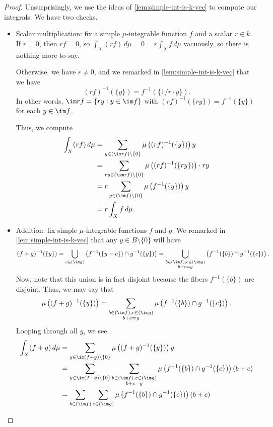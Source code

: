 \documentclass[../notes.tex]{subfiles}
\begin{document}
\begin{proof}
	Unsurprisingly, we use the ideas of \autoref{lem:simple-int-is-k-vec} to compute our integrals. We have two checks.
	\begin{itemize}
		\item Scalar multiplication: fix a simple $\mu$-integrable function $f$ and a scalar $r\in k$. If $r=0$, then $rf=0$, so $\int_X(rf)\,d\mu=0=r\int_Xf\,d\mu$ vacuously, so there is nothing more to say.

		Otherwise, we have $r\ne0$, and we remarked in \autoref{lem:simple-int-is-k-vec} that we have
		\[(rf)^{-1}(\{y\})=f^{-1}(\{1/r\cdot y\}).\]
		In other words, $\im rf=\{ry:y\in\im f\}$ with $(rf)^{-1}(\{ry\})=f^{-1}(\{y\})$ for each $y\in\im f$.
		
		Thus, we compute
		\begin{align*}
			\int_X(rf)\,d\mu &= \sum_{y\in(\im rf)\setminus\{0\}}\mu\left((rf)^{-1}(\{y\})\right)y \\
			&= \sum_{ry\in(\im rf)\setminus\{0\}}\mu\left((rf)^{-1}(\{ry\})\right)\cdot ry \\
			&= r\sum_{y\in(\im f)\setminus\{0\}}\mu\left(f^{-1}(\{y\})\right)y \\
			&= r\int_Xf\,d\mu.
		\end{align*}
		\item Addition: fix simple $\mu$-integrable functions $f$ and $g$. We remarked in \autoref{lem:simple-int-is-k-vec} that any $y\in B\setminus\{0\}$ will have
		\[(f+g)^{-1}(\{y\})=\bigcup_{c\in(\im g)}\left(f^{-1}(\{y-c\})\cap g^{-1}(\{y\})\right)=\bigcup_{\substack{b\in(\im f),c\in(\im g)\\b+c=y}}\left(f^{-1}(\{b\})\cap g^{-1}(\{c\})\right).\]
		Now, note that this union is in fact disjoint because the fibers $f^{-1}(\{b\})$ are disjoint. Thus, we may say that
		\[\mu\left((f+g)^{-1}(\{y\})\right)=\sum_{\substack{b\in(\im f),c\in(\im g)\\b+c=y}}\mu\left(f^{-1}(\{b\})\cap g^{-1}(\{c\})\right).\]
		Looping through all $y$, we see
		\begin{align*}
			\int_X(f+g)\,d\mu &= \sum_{y\in\im(f+g)\setminus\{0\}}\mu\left((f+g)^{-1}(\{y\})\right)y \\
			&= \sum_{y\in\im(f+g)\setminus\{0\}}\sum_{\substack{b\in(\im f),c\in(\im g)\\b+c=y}}\mu\left(f^{-1}(\{b\})\cap g^{-1}(\{c\})\right)(b+c) \\
			&= \sum_{b\in(\im f)}\sum_{c\in(\im g)}\mu\left(f^{-1}(\{b\})\cap g^{-1}(\{c\})\right)(b+c) \\

\end{align*}
\end{itemize}
\end{proof}
\end{document}
